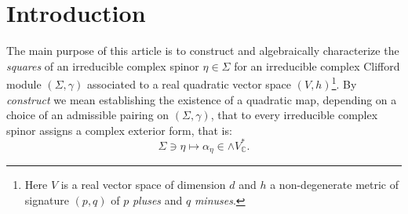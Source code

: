 \documentclass[10pt,a4paper,twoside,reqno]{amsart}
\theoremstyle{plain}
\theoremstyle{definition}
\theoremstyle{remark}
\begin{document}

\section{Introduction}


The main purpose of this article is to construct and algebraically characterize the \emph{squares} of an irreducible complex spinor $\eta\in\Sigma$ for an irreducible complex Clifford module $(\Sigma,\gamma)$ associated to a real quadratic vector space $(V,h)$\footnote{Here $V$ is a real vector space of dimension $d$ and $h$ a non-degenerate metric of signature $(p,q)$ of $p$ \emph{pluses} and $q$ \emph{minuses}.}. By \emph{construct} we mean establishing the existence of a quadratic map, depending on a choice of an admissible pairing on $(\Sigma,\gamma)$, that to every irreducible complex spinor assigns a complex exterior form, that is:
\begin{equation*}
\Sigma \ni \eta \mapsto \alpha_{\eta}\in \wedge V^{\ast}_{\mathbb{C}}.
\end{equation*}
\end{document}
